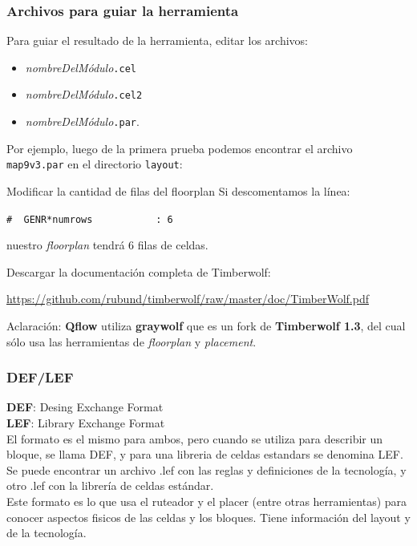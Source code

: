 \documentclass{beamer}
\begin{document}
\begin{frame}[fragile]
  \frametitle{Archivos para guiar la herramienta}

Para guiar el resultado de la herramienta, editar los archivos:
\begin{itemize}
  \item \emph{nombreDelMódulo}\verb#.cel# 
  \item \emph{nombreDelMódulo}\verb#.cel2# 
  \item \emph{nombreDelMódulo}\verb#.par#.
\end{itemize}

Por ejemplo, luego de la primera prueba podemos encontrar el archivo \verb#map9v3.par# en el directorio \verb.layout.:
\begin{exampleblock}{Modificar la cantidad de filas del floorplan}
Si descomentamos la línea:

\verb.#  GENR*numrows           : 6. 

nuestro \emph{floorplan} tendrá 6 filas de celdas. 
\end{exampleblock}


\end{frame}

\begin{frame}
  Descargar la documentación completa de Timberwolf:
  \begin{tiny}
  \url{https://github.com/rubund/timberwolf/raw/master/doc/TimberWolf.pdf}
\end{tiny}

Aclaración: \textbf{Qflow} utiliza \textbf{graywolf} que es un fork de \textbf{Timberwolf 1.3}, del cual sólo usa las herramientas de \emph{floorplan} y \emph{placement}.
\end{frame}


\begin{frame}
\frametitle{DEF/LEF}

\textbf{DEF}: Desing Exchange Format \\
\textbf{LEF}: Library Exchange Format \\


El formato es el mismo para ambos, pero cuando se utiliza para describir un bloque, se llama DEF, y para una libreria de celdas estandars se denomina LEF.
Se puede encontrar un archivo .lef con las reglas y definiciones de la tecnolog\'ia, y otro .lef con la librer\'ia de celdas est\'andar.\\
Este formato es lo que usa el ruteador y el placer (entre otras herramientas) para conocer aspectos fisicos de las celdas y los bloques. Tiene informaci\'on del layout y de la tecnolog\'ia. 



\end{frame}
\end{document}
